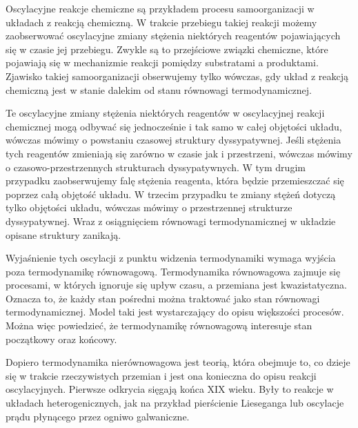 \documentclass[10pt, a4paper, twoside, onecolumn]{article}
\numberwithin{equation}{section}
\begin{document}
	Oscylacyjne reakcje chemiczne są przykładem procesu samoorganizacji w układach z reakcją chemiczną. W trakcie przebiegu takiej reakcji możemy zaobserwować oscylacyjne zmiany stężenia niektórych reagentów pojawiających się w czasie jej przebiegu. Zwykle są to przejściowe związki chemiczne, które pojawiają się w mechanizmie reakcji pomiędzy substratami a produktami. Zjawisko takiej samoorganizacji obserwujemy tylko wówczas, gdy układ z reakcją chemiczną jest w stanie dalekim od stanu równowagi termodynamicznej. \par
	Te oscylacyjne zmiany stężenia niektórych reagentów w oscylacyjnej reakcji chemicznej mogą odbywać się jednocześnie i tak samo w całej objętości układu, wówczas mówimy o powstaniu czasowej struktury dyssypatywnej. Jeśli stężenia tych reagentów zmieniają się zarówno w czasie jak i przestrzeni, wówczas mówimy o czasowo-przestrzennych strukturach dyssypatywnych. W tym drugim przypadku zaobserwujemy falę stężenia reagenta, która będzie przemieszczać się poprzez całą objętość układu. W trzecim przypadku te zmiany stężeń dotyczą tylko objętości układu, wówczas mówimy o przestrzennej strukturze dyssypatywnej. Wraz z osiągnięciem równowagi termodynamicznej w układzie opisane struktury zanikają. 
	
	
	Wyjaśnienie tych oscylacji z punktu widzenia termodynamiki wymaga wyjścia poza termodynamikę równowagową. Termodynamika równowagowa zajmuje się procesami, w których ignoruje się upływ czasu, a przemiana jest kwazistatyczna. Oznacza to, że każdy stan pośredni można traktować jako stan równowagi termodynamicznej. Model taki jest wystarczający do opisu większości procesów. Można więc powiedzieć, że termodynamikę równowagową interesuje stan początkowy oraz końcowy. \par
	Dopiero termodynamika nierównowagowa jest teorią, która obejmuje to, co dzieje się w trakcie rzeczywistych przemian i jest ona konieczna do opisu reakcji oscylacyjnych. Pierwsze odkrycia sięgają końca XIX wieku. Były to reakcje w układach heterogenicznych, jak na przykład pierścienie Lieseganga lub oscylacje prądu płynącego przez ogniwo galwaniczne. 
	
\end{document}
